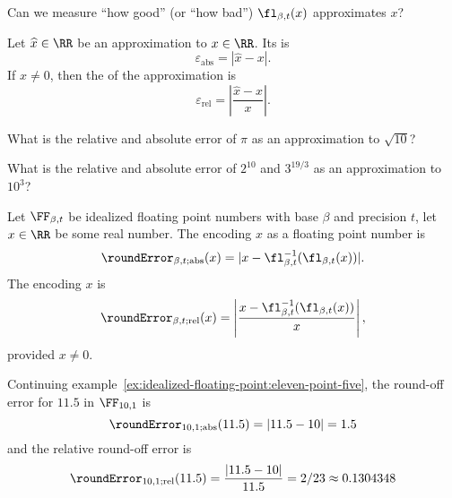 \begin{puzzle}
Can we measure ``how good'' (or ``how bad'') $\fl_{\beta,t}(x)$
approximates $x$?
\end{puzzle}

\begin{defn}
  Let $\widehat{x}\in\RR$ be an approximation to $x\in\RR$. Its
   is
  \begin{equation}
    \varepsilon_{\text{abs}} = |\widehat{x} - x|.
  \end{equation}
  If $x\neq0$, then the  of the approximation is
  \begin{equation}
    \varepsilon_{\text{rel}} = \left|\frac{\widehat{x}-x}{x}\right|.
  \end{equation}
\end{defn}

\begin{xca}
What is the relative and absolute error of $\pi$ as an approximation to $\sqrt{10}$?
\end{xca}
\begin{xca}
What is the relative and absolute error of $2^{10}$ and $3^{19/3}$ as an
approximation to $10^{3}$?
\end{xca}

\begin{defn}
Let $\FF_{\beta,t}$ be idealized floating point numbers with base
$\beta$ and precision $t$, let $x\in\RR$ be some real number. The
 encoding $x$ as a floating point number is
\begin{equation}
\roundError_{\beta,t;\text{abs}}(x) = |x - \fl_{\beta,t}^{-1}(\fl_{\beta,t}(x))|.
\end{equation}
The  encoding $x$ is
\begin{equation}
\roundError_{\beta,t;\text{rel}}(x) = \left|\frac{x - \fl_{\beta,t}^{-1}(\fl_{\beta,t}(x))}{x}\right|,
\end{equation}
provided $x\neq0$.
\end{defn}

\begin{ex}
  Continuing
  example~\ref{ex:idealized-floating-point:eleven-point-five},
  the round-off error for $11.5$ in $\FF_{10,1}$ is
  \begin{equation}
    \roundError_{10,1;\text{abs}}(11.5) = |11.5 - 10| = 1.5
  \end{equation}
  and the relative round-off error is
  \begin{equation}
    \roundError_{10,1;\text{rel}}(11.5) = \frac{|11.5 - 10|}{11.5} = 2/23\approx 0.1304348
  \end{equation}
\end{ex}

